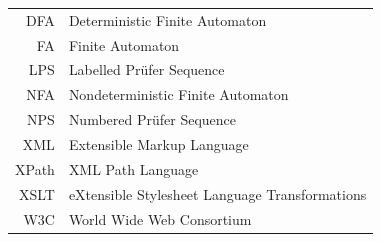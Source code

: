 \documentclass[english,bachelor,oneside]{ctufit-thesis}
\begin{document}
\begin{tabular}{rl}
	DFA   & Deterministic Finite Automaton                 \\
	FA    & Finite Automaton                               \\
	LPS   & Labelled Prüfer Sequence                       \\
	NFA   & Nondeterministic Finite Automaton              \\
	NPS   & Numbered Prüfer Sequence                       \\
	XML   & Extensible Markup Language                     \\
	XPath & XML Path Language                              \\
	XSLT  & eXtensible Stylesheet Language Transformations \\
	W3C   & World Wide Web Consortium
\end{tabular}
\resumeTOCentries
\mainmatter\mainmatterinit %


\appendix\appendixinit %


\backmatter %

\begin{sloppypar}
\printbibliography %
\end{sloppypar}

\end{document}
